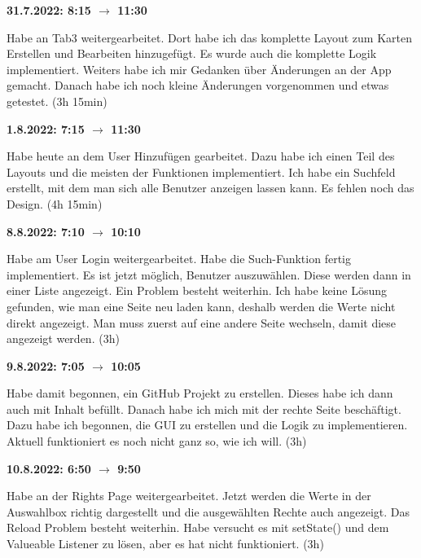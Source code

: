 \vspace{0.5cm}

\textbf{31.7.2022: 8:15 $\rightarrow$ 11:30} \

Habe an Tab3 weitergearbeitet. Dort habe ich das komplette Layout zum Karten Erstellen und Bearbeiten hinzugefügt. Es wurde auch die komplette Logik implementiert. Weiters habe ich mir Gedanken über Änderungen an der App gemacht. Danach habe ich noch kleine Änderungen vorgenommen und etwas getestet. (3h 15min)

\vspace{0.5cm}

\textbf{1.8.2022: 7:15 $\rightarrow$ 11:30} \

Habe heute an dem User Hinzufügen gearbeitet. Dazu habe ich einen Teil des Layouts und die meisten der Funktionen implementiert. Ich habe ein Suchfeld erstellt, mit dem man sich alle Benutzer anzeigen lassen kann. Es fehlen noch das Design. (4h 15min)

\vspace{0.5cm}

\textbf{8.8.2022: 7:10 $\rightarrow$ 10:10} \

Habe am User Login weitergearbeitet. Habe die Such-Funktion fertig implementiert. Es ist jetzt möglich, Benutzer auszuwählen. Diese werden dann in einer Liste angezeigt. Ein Problem besteht weiterhin. Ich habe keine Lösung gefunden, wie man eine Seite neu laden kann, deshalb werden die Werte nicht direkt angezeigt. Man muss zuerst auf eine andere Seite wechseln, damit diese angezeigt werden. (3h)

\vspace{0.5cm}

\textbf{9.8.2022: 7:05 $\rightarrow$ 10:05} \

Habe damit begonnen, ein GitHub Projekt zu erstellen. Dieses habe ich dann auch mit Inhalt befüllt. Danach habe ich mich mit der rechte Seite beschäftigt. Dazu habe ich begonnen, die GUI zu erstellen und die Logik zu implementieren. Aktuell funktioniert es noch nicht ganz so, wie ich will. (3h)

\vspace{0.5cm}

\textbf{10.8.2022: 6:50 $\rightarrow$ 9:50} \

Habe an der Rights Page weitergearbeitet. Jetzt werden die Werte in der Auswahlbox richtig dargestellt und die ausgewählten Rechte auch angezeigt. Das Reload Problem besteht weiterhin. Habe versucht es mit setState() und dem Valueable Listener zu lösen, aber es hat nicht funktioniert. (3h)

